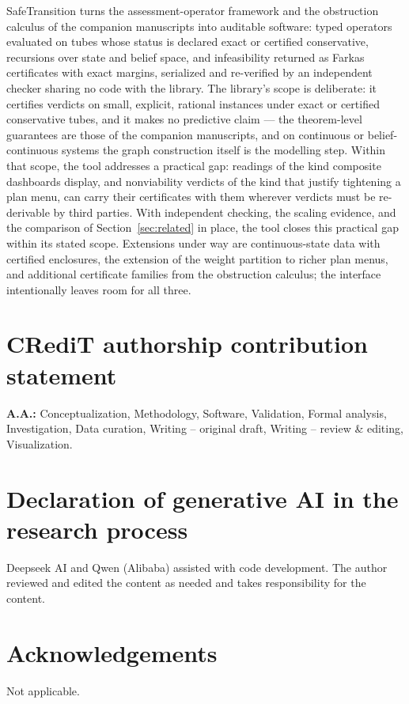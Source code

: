 \documentclass[3p,11pt]{elsarticle}
\begin{document}
SafeTransition turns the assessment-operator framework and the obstruction
calculus of the companion manuscripts into auditable software: typed
operators evaluated on tubes whose status is declared exact or certified
conservative, recursions over state and belief space, and infeasibility
returned as Farkas certificates with exact margins,
serialized and re-verified by an independent checker sharing no code with
the library. The library's scope is deliberate: it certifies verdicts on
small, explicit, rational instances under exact or certified conservative
tubes, and it makes no predictive claim --- the theorem-level guarantees
are those of the companion manuscripts, and on continuous or
belief-continuous systems the graph construction itself is the modelling
step. Within that scope, the tool addresses a practical gap: readings of
the kind composite dashboards display, and nonviability verdicts of the
kind that justify tightening a plan menu, can carry their certificates with
them wherever verdicts must be re-derivable by third parties. With
independent checking, the scaling evidence, and the comparison of
Section~\ref{sec:related} in place, the tool closes this practical gap
within its stated scope. Extensions
under way are continuous-state data with certified enclosures, the
extension of the weight partition to richer plan menus, and additional
certificate families from the obstruction calculus; the interface
intentionally leaves room for all three.

\section*{CRediT authorship contribution statement}
\textbf{A.A.:} Conceptualization, Methodology, Software, Validation,
Formal analysis, Investigation, Data curation, Writing -- original draft,
Writing -- review \& editing, Visualization.

\section*{Declaration of generative AI in the research process}
Deepseek AI and Qwen (Alibaba) assisted with code development. The author
reviewed and edited the content as needed and takes responsibility for the
content.

\section*{Acknowledgements}
Not applicable.
\end{document}
